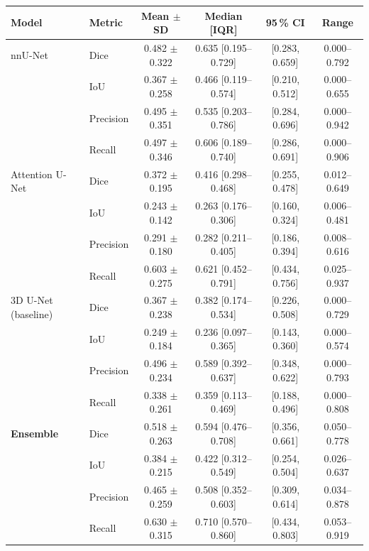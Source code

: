 \small
\setlength{\tabcolsep}{5pt}
\begin{tabular}{@{}llcccc@{}}
\toprule
Model & Metric & Mean $\pm$ SD & Median [IQR] & 95\,\% CI & Range \\
\midrule
nnU-Net & Dice & 0.482 $\pm$ 0.322 & 0.635 [0.195--0.729] & [0.283, 0.659] & 0.000--0.792 \\
 & IoU & 0.367 $\pm$ 0.258 & 0.466 [0.119--0.574] & [0.210, 0.512] & 0.000--0.655 \\
 & Precision & 0.495 $\pm$ 0.351 & 0.535 [0.203--0.786] & [0.284, 0.696] & 0.000--0.942 \\
 & Recall & 0.497 $\pm$ 0.346 & 0.606 [0.189--0.740] & [0.286, 0.691] & 0.000--0.906 \\
\addlinespace
Attention U-Net & Dice & 0.372 $\pm$ 0.195 & 0.416 [0.298--0.468] & [0.255, 0.478] & 0.012--0.649 \\
 & IoU & 0.243 $\pm$ 0.142 & 0.263 [0.176--0.306] & [0.160, 0.324] & 0.006--0.481 \\
 & Precision & 0.291 $\pm$ 0.180 & 0.282 [0.211--0.405] & [0.186, 0.394] & 0.008--0.616 \\
 & Recall & 0.603 $\pm$ 0.275 & 0.621 [0.452--0.791] & [0.434, 0.756] & 0.025--0.937 \\
\addlinespace
3D U-Net (baseline) & Dice & 0.367 $\pm$ 0.238 & 0.382 [0.174--0.534] & [0.226, 0.508] & 0.000--0.729 \\
 & IoU & 0.249 $\pm$ 0.184 & 0.236 [0.097--0.365] & [0.143, 0.360] & 0.000--0.574 \\
 & Precision & 0.496 $\pm$ 0.234 & 0.589 [0.392--0.637] & [0.348, 0.622] & 0.000--0.793 \\
 & Recall & 0.338 $\pm$ 0.261 & 0.359 [0.113--0.469] & [0.188, 0.496] & 0.000--0.808 \\
\addlinespace
\textbf{Ensemble} & Dice & 0.518 $\pm$ 0.263 & 0.594 [0.476--0.708] & [0.356, 0.661] & 0.050--0.778 \\
 & IoU & 0.384 $\pm$ 0.215 & 0.422 [0.312--0.549] & [0.254, 0.504] & 0.026--0.637 \\
 & Precision & 0.465 $\pm$ 0.259 & 0.508 [0.352--0.603] & [0.309, 0.614] & 0.034--0.878 \\
 & Recall & 0.630 $\pm$ 0.315 & 0.710 [0.570--0.860] & [0.434, 0.803] & 0.053--0.919 \\
\bottomrule
\end{tabular}%
